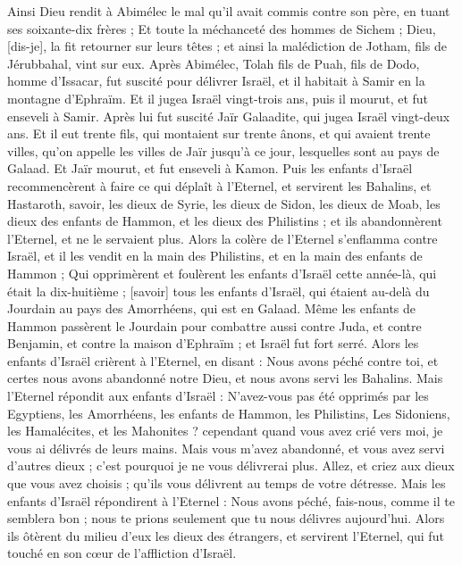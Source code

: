 \begin{multicols}{2}
Ainsi Dieu rendit à Abimélec le mal qu'il avait commis contre son père, en tuant ses soixante-dix frères ;
Et toute la méchanceté des hommes de Sichem ; Dieu, [dis-je], la fit retourner sur leurs têtes ; et ainsi la malédiction de Jotham, fils de Jérubbahal, vint sur eux.
\VerseOne{}Après Abimélec, Tolah fils de Puah, fils de Dodo, homme d'Issacar, fut suscité pour délivrer Israël, et il habitait à Samir en la montagne d'Ephraïm.
Et il jugea Israël vingt-trois ans, puis il mourut, et fut enseveli à Samir.
Après lui fut suscité Jaïr Galaadite, qui jugea Israël vingt-deux ans.
Et il eut trente fils, qui montaient sur trente ânons, et qui avaient trente villes, qu'on appelle les villes de Jaïr jusqu'à ce jour, lesquelles sont au pays de Galaad.
Et Jaïr mourut, et fut enseveli à Kamon.
Puis les enfants d'Israël recommencèrent à faire ce qui déplaît à l'Eternel, et servirent les Bahalins, et Hastaroth, savoir, les dieux de Syrie, les dieux de Sidon, les dieux de Moab, les dieux des enfants de Hammon, et les dieux des Philistins ; et ils abandonnèrent l'Eternel, et ne le servaient plus.
Alors la colère de l'Eternel s'enflamma contre Israël, et il les vendit en la main des Philistins, et en la main des enfants de Hammon ;
Qui opprimèrent et foulèrent les enfants d'Israël cette année-là, qui était la dix-huitième ; [savoir] tous les enfants d'Israël, qui étaient au-delà du Jourdain au pays des Amorrhéens, qui est en Galaad.
Même les enfants de Hammon passèrent le Jourdain pour combattre aussi contre Juda, et contre Benjamin, et contre la maison d'Ephraïm ; et Israël fut fort serré.
Alors les enfants d'Israël crièrent à l'Eternel, en disant : Nous avons péché contre toi, et certes nous avons abandonné notre Dieu, et nous avons servi les Bahalins.
Mais l'Eternel répondit aux enfants d'Israël : N'avez-vous pas été opprimés par les Egyptiens, les Amorrhéens, les enfants de Hammon, les Philistins,
Les Sidoniens, les Hamalécites, et les Mahonites ? cependant quand vous avez crié vers moi, je vous ai délivrés de leurs mains.
Mais vous m'avez abandonné, et vous avez servi d'autres dieux ; c'est pourquoi je ne vous délivrerai plus.
Allez, et criez aux dieux que vous avez choisis ; qu'ils vous délivrent au temps de votre détresse.
Mais les enfants d'Israël répondirent à l'Eternel : Nous avons péché, fais-nous, comme il te semblera bon ; nous te prions seulement que tu nous délivres aujourd'hui.
Alors ils ôtèrent du milieu d'eux les dieux des étrangers, et servirent l'Eternel, qui fut touché en son cœur de l'affliction d'Israël.

\end{multicols}
